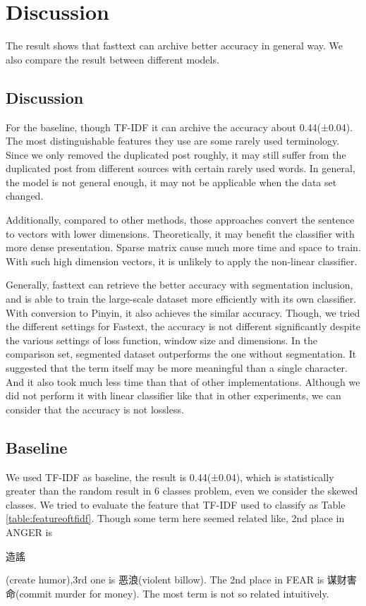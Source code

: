 \chapter{Discussion}

The result shows that fasttext can archive better accuracy in general way. We also compare the result between different models.

\section{Discussion}


For the baseline, though TF-IDF it can archive the accuracy about 0.44(±0.04). 
The most distinguishable features they use are some rarely used terminology. 
Since we only removed the duplicated post roughly, it may still suffer from the duplicated post from different sources with certain rarely used words. 
In general, the model is not general enough, it may not be applicable when the data set changed. 

Additionally, compared to other methods, those approaches convert the sentence to vectors with lower dimensions.
Theoretically, it may benefit the classifier with more dense presentation. Sparse matrix cause much more time and space to train.
With such high dimension vectors, it is unlikely to apply the non-linear classifier.

Generally, fasttext can retrieve the better accuracy with segmentation inclusion, and is able to train the large-scale dataset more efficiently with its own classifier.
With conversion to Pinyin, it also achieves the similar accuracy. Though, we tried the different settings for Fastext,
the accuracy is not different significantly despite the various settings of loss function, window size and dimensions. 
In the comparison set, segmented dataset outperforms the one without segmentation. 
It suggested that the term itself may be more meaningful than a single character. And it also took much less time than that of other implementations.
Although we did not perform it with linear classifier like that in other experiments, we can consider that the accuracy is not lossless.

\section{Baseline}

\begin{CJK}{UTF8}{gbsn}
We used TF-IDF as baseline, the result is 0.44(±0.04), which is statistically greater than the random result in 6 classes problem, 
even we consider the skewed classes.  We tried to evaluate the feature that TF-IDF used to classify as Table \ref{table:featureoftfidf}. 
Though some term here seemed related like, 2nd place in ANGER is \begin{CJK}{UTF8}{bkai}造謠\end{CJK} (create humor),3rd one is 恶浪(violent billow). 
The 2nd place in FEAR is 谋财害命(commit murder for money). The most term is not so related intuitively. 
\end{CJK}

